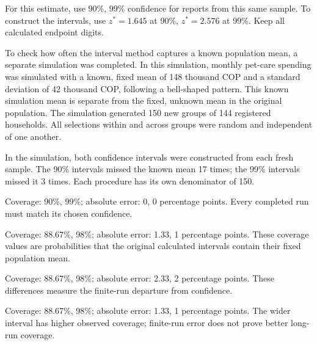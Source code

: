 For this estimate, use 90\%, 99\% confidence for reports from this same sample. To construct the intervals, use $z^*=1.645$ at 90\%, $z^*=2.576$ at 99\%. Keep all calculated endpoint digits.

To check how often the interval method captures a known population mean, a separate simulation was completed. In this simulation, monthly pet-care spending was simulated with a known, fixed mean of 148 thousand COP and a standard deviation of 42 thousand COP, following a bell-shaped pattern. This known simulation mean is separate from the fixed, unknown mean in the original population. The simulation generated 150 new groups of 144 registered households. All selections within and across groups were random and independent of one another.

In the simulation, both confidence intervals were constructed from each fresh sample.
The 90\% intervals missed the known mean 17 times; the 99\% intervals missed it 3 times. Each procedure has its own denominator of 150.

\begin{answeroptions}
\item Coverage: 90\%, 99\%; absolute error: 0, 0 percentage points. Every completed run must match its chosen confidence.
\item Coverage: 88.67\%, 98\%; absolute error: 1.33, 1 percentage points. These coverage values are probabilities that the original calculated intervals contain their fixed population mean.
\item Coverage: 88.67\%, 98\%; absolute error: 2.33, 2 percentage points. These differences measure the finite-run departure from confidence.
\item Coverage: 88.67\%, 98\%; absolute error: 1.33, 1 percentage points. The wider interval has higher observed coverage; finite-run error does not prove better long-run coverage.
\end{answeroptions}
\clearpage
